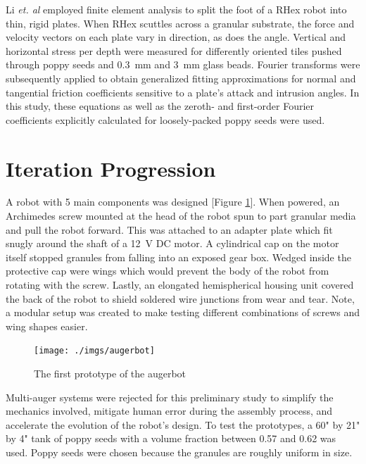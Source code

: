 \documentclass[letterpaper, 11 pt]{article}
\begin{document}
Li \textit{et. al} employed finite element analysis to split the foot of a RHex robot into thin, rigid plates. When RHex scuttles across a granular substrate, the force and velocity vectors on each plate vary in direction, as does the angle. 
Vertical and horizontal stress per depth were measured for differently oriented tiles pushed through poppy seeds and \SI{0.3}{\milli\m} and \SI{3}{\milli\m} glass beads. 
Fourier transforms were subsequently applied to obtain generalized fitting approximations for normal and tangential friction coefficients sensitive to a plate's attack and intrusion angles. In this study, these equations as well as the zeroth- and first-order Fourier coefficients explicitly calculated for loosely-packed poppy seeds were used. 

\section{Iteration Progression}

A robot with 5 main components was designed [Figure \ref{fig:augerbot}]. When powered, an Archimedes screw mounted at the head of the robot spun to part granular media and pull the robot forward. This was attached to an adapter plate which fit snugly around the shaft of a \SI{12}{\V} DC motor. A cylindrical cap on the motor itself stopped granules from falling into an exposed gear box. Wedged inside the protective cap were wings which would prevent the body of the robot from rotating with the screw. Lastly, an elongated hemispherical housing unit covered the back of the robot to shield soldered wire junctions from wear and tear. Note, a modular setup was created to make testing different combinations of screws and wing shapes easier. 

\begin{figure}[H]
\centering
\texttt{[image: ./imgs/augerbot]}
\caption{The first prototype of the augerbot}
\label{fig:augerbot}
\end{figure}

Multi-auger systems were rejected for this preliminary study to simplify the mechanics involved, mitigate human error during the assembly process, and accelerate the evolution of the robot's design. To test the prototypes, a 60" by 21" by 4" tank of poppy seeds with a volume fraction between 0.57 and 0.62 was used. Poppy seeds were chosen because the granules are roughly uniform in size.
\end{document}
